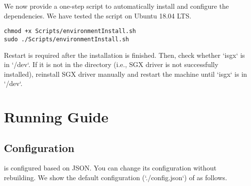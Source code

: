We now provide a one-step script to automatically install and configure the dependencies. We have tested the script on Ubuntu 18.04 LTS.

\begin{lstlisting}[style=shell, caption={Bash环境下运行一键配置脚本}, label={lst:sgxdedup-bash-env-install}]
chmod +x Scripts/environmentInstall.sh
sudo ./Scripts/environmentInstall.sh
\end{lstlisting}

Restart is required after the installation is finished. Then, check whether `isgx` is in `/dev`. If it is not in the directory (i.e., SGX driver is not successfully installed), reinstall SGX driver manually and restart the machine until `isgx` is in `/dev`.


\section{\sysnameS Running Guide}

\subsection{Configuration}

\sysnameS is configured based on JSON. You can change its configuration without rebuilding. We show the default configuration (`./config.json`) of \sysnameS as follows.

